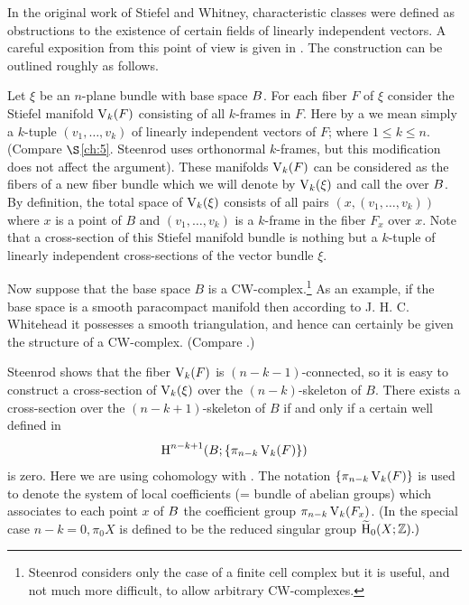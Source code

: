 \documentclass[../main]{subfiles}
\begin{document}
In the original work of Stiefel and Whitney, characteristic classes were defined as obstructions to the existence of certain fields of linearly independent vectors. A careful exposition from this point of view is given in \cite[\S 25.6,35 and 38]{steenrod1951}. The construction can be outlined roughly as follows.

Let $\xi$ be an $n$-plane bundle with base space $B$. For each fiber $F$ of $\xi$ consider the Stiefel manifold $\operatorname{V}_{k}(F)$ consisting of all $k$-frames in $F$. Here by a  we mean simply a $k$-tuple $(v_{1}, \ldots, v_{k})$ of linearly independent vectors of $F$; where $1 \leq k \leq n$. (Compare $\S$\ref{ch:5}. Steenrod uses orthonormal $k$-frames, but this modification does not affect the argument). These manifolds $\operatorname{V}_{k}(F)$ can be considered as the fibers of a new fiber bundle which we will denote by $\operatorname{V}_{k}(\xi)$ and call the  over $B$. By definition, the total space of $\operatorname{V}_{k}(\xi)$ consists of all pairs $(x,(v_{1}, \ldots, v_{k}))$ where $x$ is a point of $B$ and $(v_{1}, \ldots, v_{k})$ is a $k$-frame in the fiber $F_{x}$ over $x$. Note that a cross-section of this Stiefel manifold bundle is nothing but a $k$-tuple of linearly independent cross-sections of the vector bundle $\xi$.

Now suppose that the base space $B$ is a CW-complex.\footnote{Steenrod considers only the case of a finite cell complex but it is useful, and not much more difficult, to allow arbitrary CW-complexes.} As an example, if the base space is a smooth paracompact manifold then according to J. H. C. Whitehead it possesses a smooth triangulation, and hence can certainly be given the structure of a CW-complex. (Compare \cite{munkres1966differential}.)

 Steenrod shows that the fiber $\operatorname{V}_{k}(F)$ is $(n-k-1)$-connected, so it is easy to construct a cross-section of $\operatorname{V}_{k}(\xi)$ over the $(n-k)$-skeleton of $B$. There exists a cross-section over the $(n-k+1)$-skeleton of $B$ if and only if a certain well defined  in
\[
\operatorname{H}^{n-k+1}(B ;\{\pi_{n-k} \operatorname{V}_{k}(F)\})
\]
is zero. Here we are using cohomology with . The notation $\{\pi_{n-k}\operatorname{V}_{k}(F)\}$ is used to denote the system of local coefficients (= bundle of abelian groups) which associates to each point $x$ of $B$ the coefficient group $\pi_{n-k} \operatorname{V}_{k}(F_{x})$. (In the special case $n-k=0, \pi_{0} X$ is defined to be the reduced singular group $\xtilde{\homology}_{0}(X ; \mathbb{Z}) .)$
\end{document}
